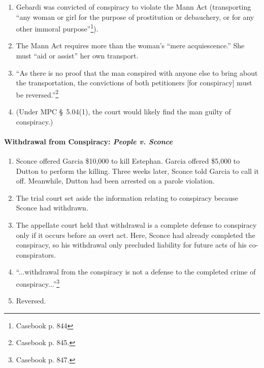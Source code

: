 \begin{enumerate}
    \item Gebardi was convicted of conspiracy to violate the Mann Act 
    (transporting ``any woman or girl for the purpose of prostitution or 
    debauchery, or for any other immoral purpose''\footnote{Casebook p. 844}).
    \item The Mann Act requires more than the woman's ``mere acquiescence.'' 
    She must ``aid or assist'' her own transport.
    \item ``As there is no proof that the man conspired with anyone else to 
    bring about the transportation, the convictions of both petitioners [for 
    conspiracy] must be reversed.''\footnote{Casebook p. 845.}
    \item (Under MPC \S\ 5.04(1), the court would likely find the man 
    guilty of conspiracy.)
\end{enumerate}

\paragraph{Withdrawal from Conspiracy: \emph{People v. Sconce}}

\begin{enumerate}
    \item Sconce offered Garcia \$10,000 to kill Estephan. Garcia offered 
    \$5,000 to Dutton to perform the killing. Three weeks later, Sconce told 
    Garcia to call it off. Meanwhile, Dutton had been arrested on a parole 
    violation.
    \item The trial court set aside the information relating to conspiracy 
    because Sconce had withdrawn.
    \item The appellate court held that withdrawal is a complete defense to 
    conspiracy only if it occurs before an overt act. Here, Sconce had already 
    completed the conspiracy, so his withdrawal only precluded liability for 
    future acts of his co-conspirators.
    \item ``...withdrawal from the conspiracy is not a defense to the 
    completed crime of conspiracy...''\footnote{Casebook p. 847.}
    \item Reversed.
\end{enumerate}

